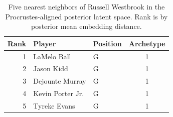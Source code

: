 \begin{table}[htbp]
  \centering\small
  \begin{tabular}{rllc}
    \toprule
    Rank & Player & Position & Archetype \\
    \midrule
    1 & LaMelo Ball & G & 1 \\
    2 & Jason Kidd & G & 1 \\
    3 & Dejounte Murray & G & 1 \\
    4 & Kevin Porter Jr. & G & 1 \\
    5 & Tyreke Evans & G & 1 \\
    \bottomrule
  \end{tabular}
  \caption{Five nearest neighbors of Russell Westbrook in the Procrustes-aligned posterior latent space. Rank is by posterior mean embedding distance.}
  \label{tab:Russell_Westbrook_neighbors}
\end{table}


